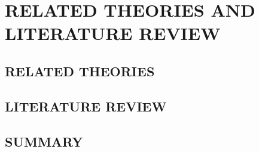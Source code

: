 \chapter{RELATED THEORIES AND LITERATURE REVIEW}

\section{RELATED THEORIES}

\section{LITERATURE REVIEW}

\section{SUMMARY}
